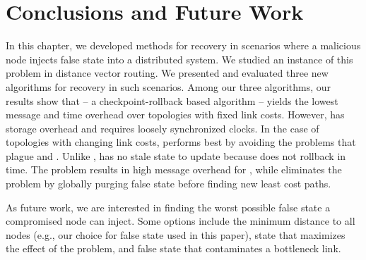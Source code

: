 \section{Conclusions and Future Work}
\label{sec:future}

In this chapter, we developed methods for recovery in scenarios where a malicious node injects false state into a distributed system.  
We studied an instance of this problem in distance vector routing.
We presented and evaluated three new algorithms for recovery in such scenarios. %
Among our three algorithms, our results show that \cpr -- a checkpoint-rollback based algorithm -- yields the lowest message and time overhead over topologies
with fixed link costs.  However, \cpr has storage overhead and requires loosely synchronized clocks.
In the case of topologies with changing link costs, \purge performs best by avoiding the problems that plague \cpr and \seconds.
Unlike \cprs, \purge has no stale state to update because \purge does not rollback in time.  
The \infinity problem results in high message overhead for \seconds, while \purge eliminates the \infinity problem by globally purging false state before finding new least cost paths.

As future work, we are interested in finding the worst possible false state a compromised node can inject.  Some options include the minimum distance to all nodes (e.g., 
our choice for false state used in this paper), state that maximizes the effect of the \infinity problem, and false state that contaminates a bottleneck link. 


